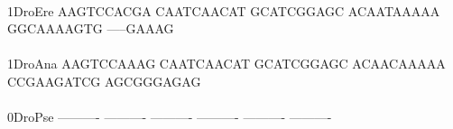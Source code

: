\documentclass[11pt,twoside,reqno,a4paper]{article}
\begin{document}
{\hspace*{5\charwidth}\hspace*{7\charwidth}\hspace*{1\charwidth}\hspace*{1\charwidth}\hspace*{1\charwidth}\hspace*{1\charwidth}\hspace*{1\charwidth}\hspace*{1\charwidth}\\
1\hspace*{4\charwidth}DroEre	AAGTCCACGA	CAATCAACAT	GCATCGGAGC	ACAATAAAAA	GGCAAAAGTG	-----GAAAG	\\
\hspace*{5\charwidth}\hspace*{7\charwidth}\hspace*{1\charwidth}\hspace*{1\charwidth}\hspace*{1\charwidth}\hspace*{1\charwidth}\hspace*{1\charwidth}\hspace*{1\charwidth}\\
1\hspace*{4\charwidth}DroAna	AAGTCCAAAG	CAATCAACAT	GCATCGGAGC	ACAACAAAAA	CCGAAGATCG	AGCGGGAGAG	\\
\hspace*{5\charwidth}\hspace*{7\charwidth}\hspace*{1\charwidth}\hspace*{1\charwidth}\hspace*{1\charwidth}\hspace*{1\charwidth}\hspace*{1\charwidth}\hspace*{1\charwidth}\\
0\hspace*{4\charwidth}DroPse	----------	----------	----------	----------	----------	----------	\\
\hspace*{5\charwidth}\hspace*{7\charwidth}\hspace*{1\charwidth}\hspace*{1\charwidth}\hspace*{1\charwidth}\hspace*{1\charwidth}\hspace*{1\charwidth}\hspace*{1\charwidth}\\
}
\end{document}
